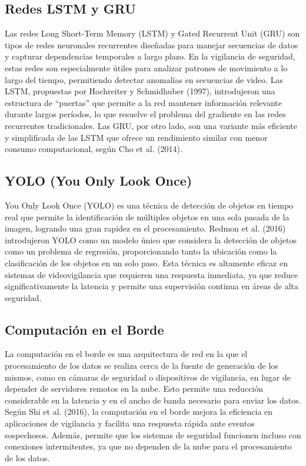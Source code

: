 \documentclass[listof=nochaptergap,12pt,times,authoryear]{report}
\begin{document}
\subsection{Redes LSTM y GRU}
Las redes Long Short-Term Memory (LSTM) y Gated Recurrent Unit (GRU) son tipos de redes neuronales recurrentes diseñadas para manejar secuencias de datos y capturar dependencias temporales a largo plazo. En la vigilancia de seguridad, estas redes son especialmente útiles para analizar patrones de movimiento a lo largo del tiempo, permitiendo detectar anomalías en secuencias de video. Las LSTM, propuestas por Hochreiter y Schmidhuber (1997), introdujeron una estructura de “puertas” que permite a la red mantener información relevante durante largos períodos, lo que resuelve el problema del gradiente en las redes recurrentes tradicionales. Las GRU, por otro lado, son una variante más eficiente y simplificada de las LSTM que ofrece un rendimiento similar con menor consumo computacional, según Cho et al. (2014).


\subsection{YOLO (You Only Look Once)}
You Only Look Once (YOLO) es una técnica de detección de objetos en tiempo real que permite la identificación de múltiples objetos en una sola pasada de la imagen, logrando una gran rapidez en el procesamiento. Redmon et al. (2016) introdujeron YOLO como un modelo único que considera la detección de objetos como un problema de regresión, proporcionando tanto la ubicación como la clasificación de los objetos en un solo paso. Esta técnica es altamente eficaz en sistemas de videovigilancia que requieren una respuesta inmediata, ya que reduce significativamente la latencia y permite una supervisión continua en áreas de alta seguridad.

\subsection{Computación en el Borde}
La computación en el borde es una arquitectura de red en la que el procesamiento de los datos se realiza cerca de la fuente de generación de los mismos, como en cámaras de seguridad o dispositivos de vigilancia, en lugar de depender de servidores remotos en la nube. Esto permite una reducción considerable en la latencia y en el ancho de banda necesario para enviar los datos. Según Shi et al. (2016), la computación en el borde mejora la eficiencia en aplicaciones de vigilancia y facilita una respuesta rápida ante eventos sospechosos. Además, permite que los sistemas de seguridad funcionen incluso con conexiones intermitentes, ya que no dependen de la nube para el procesamiento de los datos.
\end{document}

